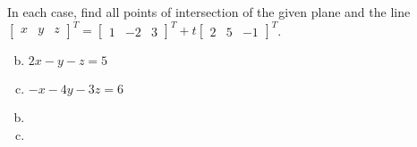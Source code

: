 \documentclass[../main.tex]{subfiles}
\begin{document}
In each case, find all points of intersection of the given plane and the line \\
\(
	\begin{bmatrix}x&y&z\end{bmatrix}^T
	=
	\begin{bmatrix}1&-2&3\end{bmatrix}^T
	+
	t
	\begin{bmatrix}2&5&-1\end{bmatrix}^T
\).
\begin{enumerate}[a)]
	\setcounter{enumi}{1}
	\item $2x - y - z = 5$
	\setcounter{enumi}{3}
	\item $-x - 4y - 3z = 6$
\end{enumerate}

\solution
\begin{enumerate}[a)]
	\setcounter{enumi}{1}
	\item 
	\setcounter{enumi}{3}
	\item 
\end{enumerate}
\end{document}
